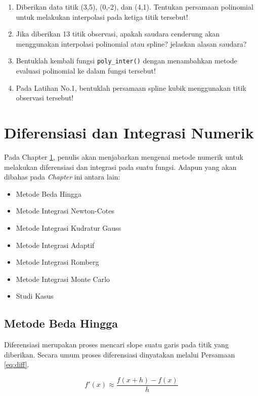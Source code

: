 \documentclass[
]{book}
\providecommand{\tightlist}{%
  \setlength{\itemsep}{0pt}\setlength{\parskip}{0pt}}
\theoremstyle{definition}
\theoremstyle{definition}
\theoremstyle{definition}
\theoremstyle{definition}
\theoremstyle{remark}
\begin{document}
\begin{enumerate}
\def\labelenumi{\arabic{enumi}.}
\tightlist
\item
  Diberikan data titik (3,5), (0,-2), dan (4,1). Tentukan persamaan polinomial untuk melakukan interpolasi pada ketiga titik tersebut!
\item
  Jika diberikan 13 titik observasi, apakah saudara cenderung akan menggunakan interpolasi polinomial atau spline? jelaskan alasan saudara?
\item
  Bentuklah kembali fungsi \texttt{poly\_inter()} dengan menambahkan metode evaluasi polinomial ke dalam fungsi tersebut!
\item
  Pada Latihan No.1, bentuklah persamaan spline kubik menggunakan titik observasi tersebut!
\end{enumerate}

\hypertarget{diffinteg}{%
\chapter{Diferensiasi dan Integrasi Numerik}\label{diffinteg}}

Pada Chapter \ref{diffinteg}, penulis akan menjabarkan mengenai metode numerik untuk melakukan diferensiasi dan integrasi pada suatu fungsi. Adapun yang akan dibahas pada \emph{Chapter} ini antara lain:

\begin{itemize}
\tightlist
\item
  Metode Beda Hingga
\item
  Metode Integrasi Newton-Cotes
\item
  Metode Integrasi Kudratur Gauss
\item
  Metode Integrasi Adaptif
\item
  Metode Integrasi Romberg
\item
  Metode Integrasi Monte Carlo
\item
  Studi Kasus
\end{itemize}

\hypertarget{finitediff}{%
\section{Metode Beda Hingga}\label{finitediff}}

Diferensiasi merupakan proses mencari slope suatu garis pada titik yang diberikan. Secara umum proses diferensiasi dinyatakan melalui Persamaan \eqref{eq:diff}.

\begin{equation}
f'\left(x\right) \approx \frac{f\left(x+h\right)-f\left(x\right)}{h}
  \label{eq:diff}
\end{equation}
\end{document}
